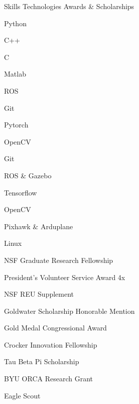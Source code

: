 
\begin{cventries}

  \cventrycol
  {Skills}
  {Technologies}
  {Awards \& Scholarships}
  {
    \begin{cvitems}
      \item {Python}
      \item {C++}
      \item {C}
      \item {Matlab}
      \item {ROS}
      \item{Git}
      \item{Pytorch}
      \item{OpenCV}
    \end{cvitems}
  }
  {
    \begin{cvitems}
      \item {Git}
      \item {ROS \& Gazebo}
      \item {Tensorflow}
      \item {OpenCV}
      \item {Pixhawk \& Arduplane}
      \item {Linux}
    \end{cvitems}
  }
  {
    \begin{cvitems}
      \item {NSF Graduate Research Fellowship}
      \item {President's Volunteer Service Award 4x}
      \item {NSF REU Supplement}
      \item {Goldwater Scholarship Honorable Mention}
      \item {Gold Medal Congressional Award}
      \item {Crocker Innovation Fellowship}
      \item{Tau Beta Pi Scholarship}
      \item{BYU ORCA Research Grant}
      \item{Eagle Scout}
    \end{cvitems}
  }



\end{cventries}

